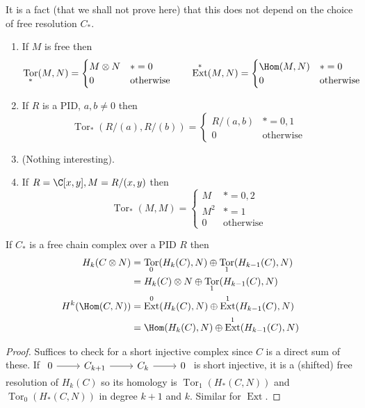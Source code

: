 \documentclass[a4paper]{article}
\DeclareMathOperator{\Tor}{Tor} %
\DeclareMathOperator{\Ext}{Ext} %
\begin{document}
It is a fact (that we shall not prove here) that this does not depend on the choice of free resolution \(C_*\).

\begin{eg}\leavevmode
  \begin{enumerate}
  \item If \(M\) is free then
    \[
      \Tor_*(M, N) =
      \begin{cases}
        M \otimes N & * = 0 \\
        0 & \text{otherwise}
      \end{cases}
      \qquad
      \Ext^*(M, N) =
      \begin{cases}
        \Hom(M, N) & * = 0 \\
        0 & \text{otherwise}
      \end{cases}
    \]
  \item If \(R\) is a PID, \(a, b \neq 0\) then
    \[
      \Tor_*(R/(a), R/(b)) =
      \begin{cases}
        R/(a, b) & * = 0, 1 \\
        0 & \text{otherwise}
      \end{cases}
    \]
  \item (Nothing interesting).
  \item If \(R = \C[x, y], M = R/(x, y)\) then
    \[
      \Tor_*(M, M) =
      \begin{cases}
        M & * = 0, 2 \\
        M^2 & * = 1 \\
        0 & \text{otherwise}
      \end{cases}
    \]
  \end{enumerate}
\end{eg}

\begin{proposition}
  If \(C_*\) is a free chain complex over a PID \(R\) then
  \begin{align*}
    H_k(C \otimes N) &= \Tor_0(H_k(C), N) \oplus \Tor_1(H_{k - 1}(C), N) \\
                     &= H_k(C) \otimes N \oplus \Tor_1(H_{k - 1}(C), N) \\
    H^k(\Hom(C, N)) &= \Ext^0(H_k(C), N) \oplus \Ext^1(H_{k - 1}(C), N) \\
                     &= \Hom(H_k(C), N) \oplus \Ext^1(H_{k - 1}(C), N)
  \end{align*}
\end{proposition}

\begin{proof}
  Suffices to check for a short injective complex since \(C\) is a direct sum of these. If \(
  \begin{tikzcd}
    0 \ar[r] & C_{k + 1} \ar[r] & C_k \ar[r] & 0
  \end{tikzcd}
  \) is short injective, it is a (shifted) free resolution of \(H_k(C)\) so its homology is \(\Tor_1(H_*(C, N))\) and \(\Tor_0(H_*(C, N))\) in degree \(k + 1\) and \(k\). Similar for \(\Ext\).
\end{proof}
\end{document}
